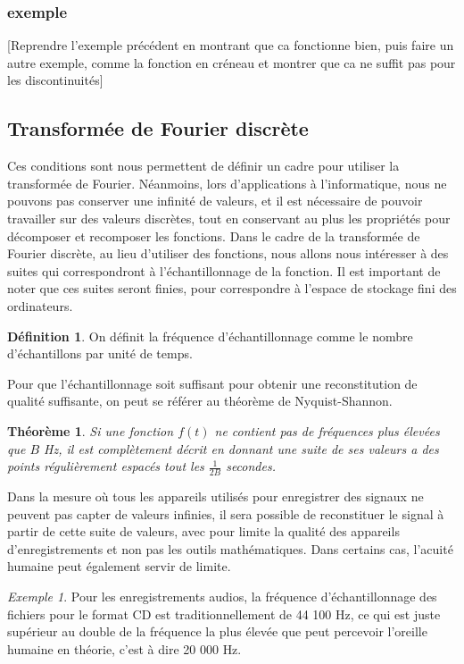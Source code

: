 \documentclass[]{article}
\newtheorem{mythm}{Théorème}
\theoremstyle{remark}
\newtheorem{myexmpl}{Exemple}
\theoremstyle{definition}
\newtheorem{mydef}{Définition}
\begin{document}
	\subsubsection{exemple}
	[Reprendre l'exemple précédent en montrant que ca fonctionne bien, puis faire un autre exemple, comme la fonction en créneau et montrer que ca ne suffit pas pour les discontinuités]
	
	
	\subsection{Transformée de Fourier discrète}
			
	Ces conditions sont nous permettent de définir un cadre pour utiliser la transformée de Fourier. Néanmoins, lors d'applications à l'informatique, nous ne pouvons pas conserver une infinité de valeurs, et il est nécessaire de pouvoir travailler sur des valeurs discrètes, tout en conservant au plus les propriétés pour décomposer et recomposer les fonctions. 		
	Dans le cadre de la transformée de Fourier discrète, au lieu d'utiliser des fonctions, nous allons nous intéresser à des suites qui correspondront à l'échantillonnage de la fonction. Il est important de noter que ces suites seront finies, pour correspondre à l'espace de stockage fini des ordinateurs. 
	

	\begin{mydef}
		On définit la fréquence d'échantillonnage comme le nombre d'échantillons par unité de temps.  
	\end{mydef}
		Pour que l'échantillonnage soit suffisant pour obtenir une reconstitution de qualité suffisante, on peut se référer au théorème de Nyquist-Shannon. 
		
	\begin{mythm}
		Si une fonction $f(t)$ ne contient pas de fréquences plus élevées que $B$ Hz, il est complètement décrit en donnant une suite de ses valeurs a des points régulièrement espacés tout les $\frac{1}{2B}$ secondes.
	\end{mythm}
	
	Dans la mesure où tous les appareils utilisés pour enregistrer des signaux ne peuvent pas capter de valeurs infinies, il sera possible de reconstituer le signal à partir de cette suite de valeurs, avec pour limite la qualité des appareils d'enregistrements et non pas les outils mathématiques. Dans certains cas, l'acuité humaine peut également servir de limite.
	
	\begin{myexmpl}
		 Pour les enregistrements audios, la fréquence d'échantillonnage des fichiers pour le format CD est traditionnellement de 44 100 Hz, ce qui est juste supérieur au double de la fréquence la plus élevée que peut percevoir l'oreille humaine en théorie, c'est à dire 20 000 Hz. 
	\end{myexmpl}
	
\end{document}
